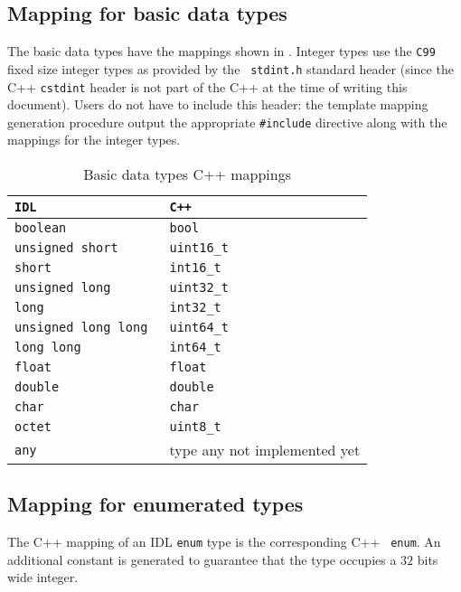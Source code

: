 \subsection{Mapping for basic data types}

The     basic     data     types     have     the     mappings     shown     in
.       Integer
types  use the  {\tt C99}  fixed size  integer types  as provided  by  the {\tt
stdint.h} standard  header (since the C++  {\tt cstdint} header is  not part of
the C++ at  the time of writing  this document).  Users do not  have to include
this header:  the template mapping generation procedure  output the appropriate
{\tt \#include} directive along with the mappings for the integer types.

\begin{table}
\caption{Basic data types C++ mappings}
\centering
\begin{tabular}{|ll|}
\doublehline
{\tt\bfseries IDL} & {\tt\bfseries C++}\\
\hline
\tt boolean              & \tt bool\\
\tt unsigned short       & \tt uint16\_t\\
\tt short                & \tt int16\_t\\
\tt unsigned long        & \tt uint32\_t\\
\tt long                 & \tt int32\_t\\
\tt unsigned long long   & \tt uint64\_t\\
\tt long long            & \tt int64\_t\\
\tt float                & \tt float\\
\tt double               & \tt double\\
\tt char                 & \tt char\\
\tt octet                & \tt uint8\_t\\
\tt any                  & type any not implemented yet\\
\hline
\end{tabular}
\label{table:mapping:cxxbasic}
\end{table}


\subsection{Mapping for enumerated types}

The  C++ mapping  of  an IDL  {\tt enum}  type  is the  corresponding C++  {\tt
enum}. An additional constant is  generated to guarantee that the type occupies
a $32$ bits wide integer.

